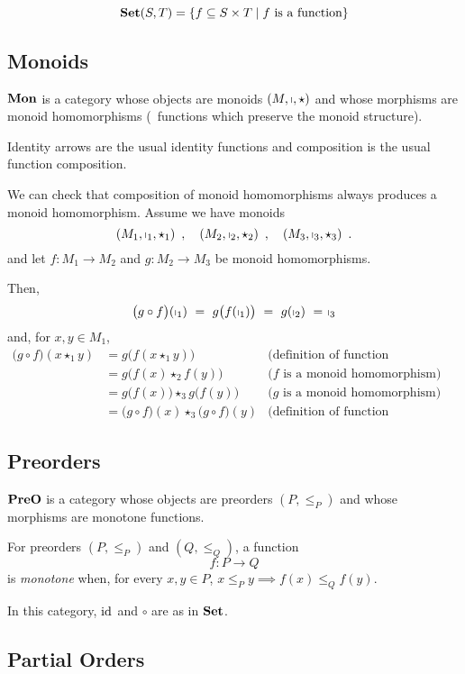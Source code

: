 \[\mathbf {Set}(S, T) = \{  f \subseteq S \times T \;|\; f \text{ is a function}
   \}\]

\subsection{Monoids}

$\mathbf {Mon}$ is a category whose objects are monoids $(M,\shortmid,\star)$ and
whose morphisms are monoid homomorphisms (\ie~functions which preserve the
monoid structure).

Identity arrows are the usual identity functions and composition is the usual
function composition.

We can check that composition of monoid homomorphisms always produces a monoid
homomorphism. Assume we have monoids
\[
  (M_1, \shortmid_1, \star_1)
  \enspace,\quad
  (M_2, \shortmid_2, \star_2)
  \enspace,\quad
  (M_3, \shortmid_3, \star_3)
  \enspace.
\]
and let $f : M_1 \rightarrow M_2$ and $g : M_2 \rightarrow M_3$ be monoid
homomorphisms.

Then,
\[
  \big(g\circ f\big)(\shortmid_1)
  \ = \ g\big(f(\shortmid_1)\big)
  \ = \ g(\shortmid_2)
  \ = \ \shortmid_3
\]
and, for $x, y \in M_1$,
\begin{align*}
  \big(g \circ f\big)(x \star_1 y)
  & = g \big(f (x \star_1 y)\big)
    & \text{(definition of function composition)}\\
  & = g \big(f (x) \star_2 f (y)\big) & \text{($f$ is a monoid homomorphism)}\\
  & = g\big(f(x)\big) \star_3 g\big(f(y)\big)
    & \text{($g$ is a monoid homomorphism)}\\
  & = \big(g \circ f\big)(x) \star_3 \big(g \circ f\big)(y)
    & \text{(definition of function composition)}
\end{align*}

\subsection{Preorders}

$\mathbf {PreO}$ is a category whose objects are preorders $(P, \le_P)$ and whose
morphisms are monotone functions.

For preorders $(P, \le_P)$ and $(Q, \le_Q)$, a function
\[f : P \rightarrow Q\]
is \emph{monotone} when, for every $x, y \in P$,
$x \le_P y \implies f(x) \le_Q
f(y)$.

In this category, $\mathrm{id}_{  }$ and $\circ$ are as in $\mathbf {Set}$.

\subsection{Partial Orders}

